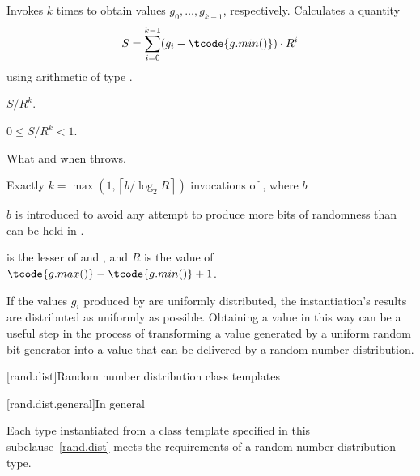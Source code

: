 \begin{itemdescr}
\pnum
\effects
 Invokes  $k$ times
 to obtain values $g_0, \dotsc, g_{k-1}$, respectively.
 Calculates a quantity
 \[
   S = \sum_{i=0}^{k-1} (g_i - \tcode{g.min()})
                        \cdot R^i
 \]
 using arithmetic of type
 .

\pnum
\returns
$S / R^k$.
\begin{note}
$0 \leq S / R^k < 1$.
\end{note}

\pnum
\throws
What and when  throws.

\pnum
\complexity
Exactly
 $k = \max(1, \left\lceil b / \log_2 R \right\rceil)$
 invocations
 of ,
 where $b$
\begin{footnote}
$b$ is introduced
   to avoid any attempt
   to produce more bits of randomness
   than can be held in .
\end{footnote}
   is the lesser of 
                and ,
 and
   $R$ is the value of $\tcode{g.max()} - \tcode{g.min()} + 1$.

\pnum
\begin{note}
If the values $g_i$ produced by  are uniformly distributed,
the instantiation's results are distributed as uniformly as possible.
Obtaining a value in this way
can be a useful step
in the process of transforming
a value generated by a uniform random bit generator
into a value
that can be delivered by a random number distribution.
\end{note}
\end{itemdescr}





[rand.dist]{Random number distribution class templates}%

[rand.dist.general]{In general}

\pnum
Each type instantiated
from a class template specified in this subclause~\ref{rand.dist}
meets the requirements
of a random number distribution type.

